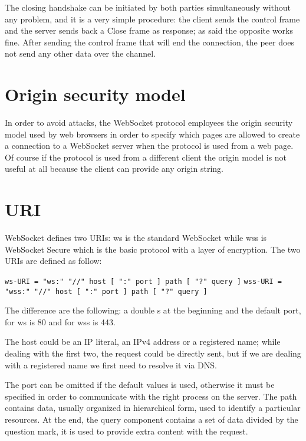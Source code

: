 The closing handshake can be initiated by both parties simultaneously without any problem, and it is a very simple procedure:
the client sends the control frame and the server sends back a Close frame as response; as said the opposite works fine.\newline
After sending the control frame that will end the connection, the peer does not send any other data over the channel.

\section{Origin security model}
In order to avoid attacks, the WebSocket protocol employees the origin security model used by web browsers in order
to specify which pages are allowed to create a connection to a WebSocket server when the protocol is used from a web page.\newline
Of course if the protocol is used from a different client the origin model is not useful at all because the client can provide any origin string.

\section{URI}
WebSocket defines two URIs: ws is the standard WebSocket while wss is WebSocket Secure which is the basic protocol with a layer of encryption.\newline
The two URIs are defined as follow:\newline

\texttt{ws-URI = "ws:" "//" host [ ":" port ] path [ "?" query ]}\newline
\texttt{wss-URI = "wss:" "//" host [ ":" port ] path [ "?" query ]}\newline

The difference are the following: a double s at the beginning and the default port, for ws is 80 and for wss is 443.\newline

The host could be an IP literal, an IPv4 address or a registered name; while dealing with the first two, the request could be directly sent, but if we are dealing with a registered name we first need to resolve it via DNS.\newline

The port can be omitted if the default values is used, otherwise it must be specified in order to communicate with the right process on the server.\newline
The path contains data, usually organized in hierarchical form, used to identify a particular resources.\newline
At the end, the query component contains a set of data divided by the question mark, it is used to provide extra content with the request.\newline

